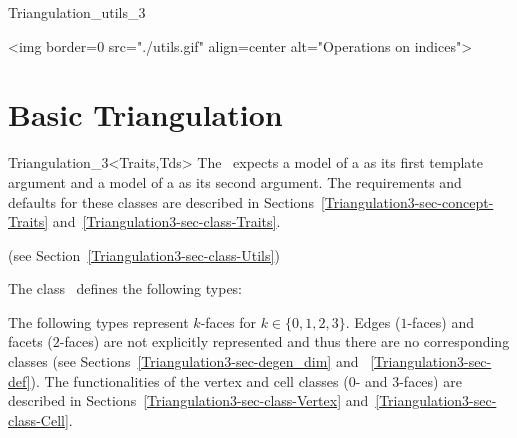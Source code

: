 \begin{ccClass}{Triangulation_utils_3}
\begin{ccHtmlOnly}
<img border=0 src="./utils.gif" align=center alt="Operations on indices">
\end{ccHtmlOnly}

\end{ccClass}

\section{Basic Triangulation}

\ccDefinition

\begin{ccClassTemplate}{Triangulation_3<Traits,Tds>}
The \ccClassTemplateName\ expects a model of a  as its first template argument and a model of a  as its second argument. The requirements and defaults for these
classes are described in Sections~\ref{Triangulation3-sec-concept-Traits} 
and~\ref{Triangulation3-sec-class-Traits}.


(see Section~\ref{Triangulation3-sec-class-Utils})

\ccTypes
The class \ccClassTemplateName\ defines the following types:
\ccThreeToTwo

\ccGlue
{}
\ccGlue
{}
\ccGlue
{}

The following types represent $k$-faces for $k\in\{0,1,2,3\}$. Edges
($1$-faces) and facets ($2$-faces) are not explicitly represented and
thus there are no corresponding classes (see
Sections~\ref{Triangulation3-sec-degen_dim} and
~\ref{Triangulation3-sec-def}). The functionalities of the 
vertex and cell classes ($0$- and $3$-faces) are described in
Sections~\ref{Triangulation3-sec-class-Vertex}
and~\ref{Triangulation3-sec-class-Cell}.

\ccGlue
{}

\ccGlue
{}


\end{ccClassTemplate}
